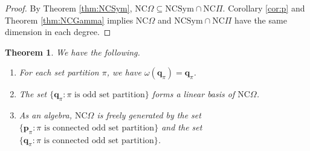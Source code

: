 \documentclass[11pt]{amsart}
\newtheorem{Theorem}{Theorem}[section]
\numberwithin{equation}{section}
\newcommand{\NCSym}{\mathrm{NCSym}}
\newcommand{\NCPeak}{\mathrm{NC}\Pi}
\newcommand{\NCGamma}{\mathrm{NC}\Omega}
\begin{document}
\begin{proof}
	By Theorem \ref{thm:NCSym}, $\NCGamma\subseteq\NCSym\cap\NCPeak$. Corollary \ref{cor:p} and Theorem \ref{thm:NCGamma} implies $\NCGamma$ and $\NCSym\cap\NCPeak$ have the same dimension in each degree.
\end{proof}




\begin{Theorem}\label{thm:qschur} We have the following. 
	\begin{enumerate}
		\item  For each set partition $\pi$, we have $\omega(\mathbf{q}_\pi)=\mathbf{q}_\pi$. 
		\item The set $\{\mathbf{q}_\pi:\pi\text{ is odd set partition}\}$ forms a linear basis of $\NCGamma$.
		\item As an algebra, $\NCGamma$ is freely generated by the set $\{\mathbf{p}_\pi:\pi\text{ is connected odd set partition}\}$ and the set $\{\mathbf{q}_\pi:\pi\text{ is connected odd set partition}\}$.
	\end{enumerate}
\end{Theorem}
\end{document}
